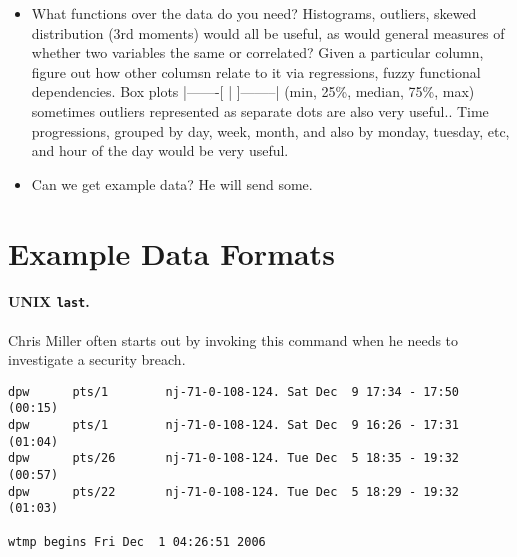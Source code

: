 \documentclass{article}
\begin{document}
\begin{itemize}
\item What functions over the data do you need?
Histograms, outliers, skewed distribution (3rd moments) would all be
useful, as would general measures of whether two variables the same or
correlated? Given a particular column, figure out how other columsn
relate to it via regressions, fuzzy functional dependencies. 
Box plots |-------[   |   ]--------| (min, 25\%, median, 75\%, max)
sometimes outliers represented as separate dots are also very useful..
Time progressions, grouped by day, week, month, and also by monday,
tuesday, etc, and hour of the day would be very useful.

\item Can we get example data?
He will send some.
\end{itemize}


{

}

\appendix

\section{Example Data Formats}
\label{sec:example formats}

\paragraph{UNIX {\tt last}.} Chris Miller often starts out by
invoking this command when he needs to investigate a security breach.

\begin{verbatim}
dpw      pts/1        nj-71-0-108-124. Sat Dec  9 17:34 - 17:50  (00:15)    
dpw      pts/1        nj-71-0-108-124. Sat Dec  9 16:26 - 17:31  (01:04)    
dpw      pts/26       nj-71-0-108-124. Tue Dec  5 18:35 - 19:32  (00:57)    
dpw      pts/22       nj-71-0-108-124. Tue Dec  5 18:29 - 19:32  (01:03)    

wtmp begins Fri Dec  1 04:26:51 2006
\end{verbatim}   
\end{document}
